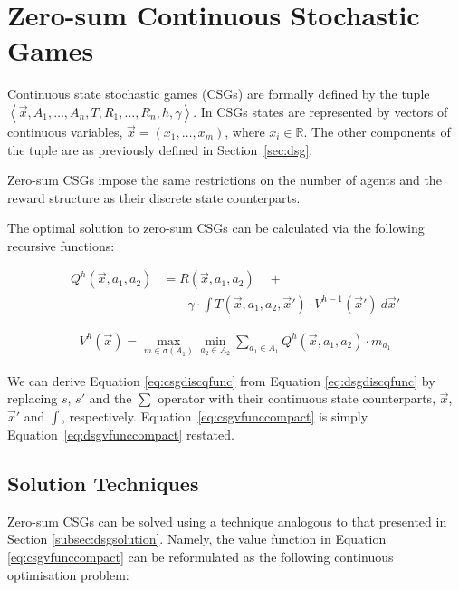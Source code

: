 \section{Zero-sum Continuous Stochastic Games}
\label{sec:csg}

Continuous state stochastic games (CSGs) are formally defined by the tuple
$ \left\langle \vec{x}, A_{1}, \ldots, A_{n}, T, R_{1}, \ldots, R_{n}, h, \gamma  \right\rangle$.
In CSGs states are represented by vectors of continuous variables, $\vec{x} = \left(x_1, \ldots, x_m \right)$, 
where $x_i \in \mathbb{R}$. The other components of the tuple are as 
previously defined in Section~\ref{sec:dsg}.

Zero-sum CSGs impose the same restrictions on the number of agents
and the reward structure as their discrete state counterparts. 

The optimal solution to zero-sum CSGs can be calculated via the following 
recursive functions:

{\small
\abovedisplayskip=0pt
\belowdisplayskip=0pt
\begin{align}
\label{eq:csgdiscqfunc}
  Q^{h}(\vec{x}, a_1, a_2) &= R(\vec{x}, a_1, a_2) \quad + \nonumber \\
  & \qquad  \gamma \cdot \int T(\vec{x}, a_1, a_2, \vec{x}') \cdot V^{h-1}(\vec{x}')\ d\vec{x}'
\end{align}
}%

{\small 
\abovedisplayskip=0pt
\belowdisplayskip=0pt
\begin{align}
\label{eq:csgvfunccompact}
  V^{h}(\vec{x}) = \max_{m \in \sigma(A_1)} \min_{a_2 \in A_2} \sum_{a_1 \in A_1} Q^{h}(\vec{x}, a_1, a_2) \cdot m_{a_{1}}
\end{align}
}%

We can derive Equation \eqref{eq:csgdiscqfunc} from Equation \eqref{eq:dsgdiscqfunc}
by replacing $s$, $s'$ and the $\sum$ operator with their continuous
state counterparts, $\vec{x}$, $\vec{x}'$ and $\int$, respectively. Equation~\eqref{eq:csgvfunccompact}
is simply Equation~\eqref{eq:dsgvfunccompact} restated.

\subsection{Solution Techniques}

Zero-sum CSGs can be solved using a technique analogous to that 
presented in Section \ref{subsec:dsgsolution}. Namely, the value function in Equation
\eqref{eq:csgvfunccompact} can be reformulated as the following continuous 
optimisation problem:

